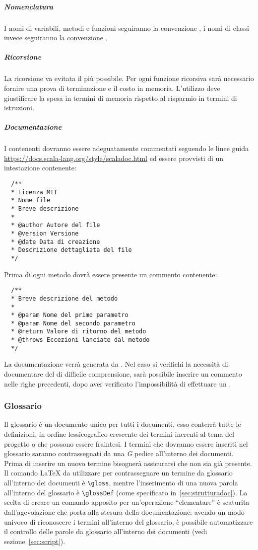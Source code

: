 \documentclass{scalatekids-article}
\begin{document}
\subparagraph{Nomenclatura}

I nomi di variabili, metodi e funzioni seguiranno la convenzione
\textit{}, i nomi di classi invece seguiranno la convenzione
\textit{}.
\subparagraph{Ricorsione}
La ricorsione va evitata il più possibile. Per ogni funzione ricorsiva sarà
necessario fornire una prova di terminazione e il costo in memoria. L'utilizzo
deve giustificare la spesa in termini di memoria rispetto al risparmio in
termini di istruzioni.

\subparagraph{Documentazione}

I  contenenti  dovranno essere adeguatamente commentati seguendo le
linee guida  \url{https://docs.scala-lang.org/style/scaladoc.html} ed essere provvisti di un
intestazione contenente:
\begin{lstlisting}
  /**
  * Licenza MIT
  * Nome file
  * Breve descrizione
  *
  * @author Autore del file
  * @version Versione
  * @date Data di creazione
  * Descrizione dettagliata del file
  */
\end{lstlisting}
Prima di ogni metodo dovrà essere presente un commento  contenente:
\begin{lstlisting}
  /**
  * Breve descrizione del metodo
  *
  * @param Nome del primo parametro
  * @param Nome del secondo parametro
  * @return Valore di ritorno del metodo
  * @throws Eccezioni lanciate dal metodo
  */
\end{lstlisting}
La documentazione verrà generata da . Nel caso si verifichi la
necessità di documentare del  di difficile comprensione, sarà possibile
inserire un commento nelle righe precedenti, dopo aver verificato
l'impossibilità di effettuare un .

\subsubsection{Glossario}

Il glossario è un documento unico per tutti i documenti, esso conterrà tutte le
definizioni, in ordine lessicografico crescente dei termini inerenti al tema
del progetto o che possono essere fraintesi. I termini che dovranno essere
inseriti nel glossario saranno contrassegnati da una \textit{G} pedice
all'interno dei documenti. Prima di inserire un nuovo termine bisognerà
assicurarsi che non sia già presente.\\ Il comando \LaTeX\xspace da utilizzare
per contrassegnare un termine da glossario all'interno dei documenti è
\verb=\gloss=, mentre l'inserimento di una nuova parola all'interno del
glossario è \verb=\glossDef= (come specificato in~\ref{sec:strutturadoc}). La
scelta di creare un comando apposito per un'operazione ``elementare'' è
scaturita dall'agevolazione che porta alla stesura della documentazione: avendo
un modo univoco di riconoscere i termini all'interno del glossario, è possibile
automatizzare il controllo delle parole da glossario all'interno dei
documenti (vedi sezione~\ref{sec:script}).
\end{document}
